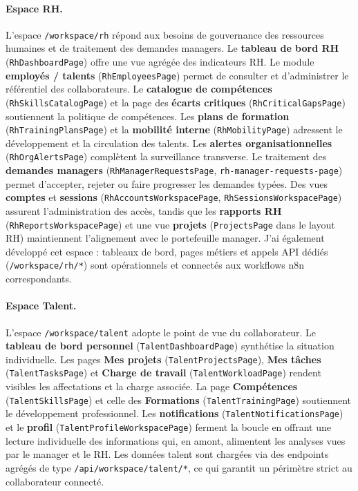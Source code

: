 \paragraph{Espace RH.}
L'espace \texttt{/workspace/rh} répond aux besoins de gouvernance des ressources humaines et de traitement des demandes managers. Le \textbf{tableau de bord RH} (\texttt{RhDashboardPage}) offre une vue agrégée des indicateurs RH. Le module \textbf{employés / talents} (\texttt{RhEmployeesPage}) permet de consulter et d'administrer le référentiel des collaborateurs. Le \textbf{catalogue de compétences} (\texttt{RhSkillsCatalogPage}) et la page des \textbf{écarts critiques} (\texttt{RhCriticalGapsPage}) soutiennent la politique de compétences. Les \textbf{plans de formation} (\texttt{RhTrainingPlansPage}) et la \textbf{mobilité interne} (\texttt{RhMobilityPage}) adressent le développement et la circulation des talents. Les \textbf{alertes organisationnelles} (\texttt{RhOrgAlertsPage}) complètent la surveillance transverse. Le traitement des \textbf{demandes managers} (\texttt{RhManagerRequestsPage}, \texttt{rh-manager-requests-page}) permet d'accepter, rejeter ou faire progresser les demandes typées. Des vues \textbf{comptes} et \textbf{sessions} (\texttt{RhAccountsWorkspacePage}, \texttt{RhSessionsWorkspacePage}) assurent l'administration des accès, tandis que les \textbf{rapports RH} (\texttt{RhReportsWorkspacePage}) et une vue \textbf{projets} (\texttt{ProjectsPage} dans le layout RH) maintiennent l'alignement avec le portefeuille manager. J'ai également développé cet espace : tableaux de bord, pages métiers et appels API dédiés (\texttt{/workspace/rh/*}) sont opérationnels et connectés aux workflows n8n correspondants.

\paragraph{Espace Talent.}
L'espace \texttt{/workspace/talent} adopte le point de vue du collaborateur. Le \textbf{tableau de bord personnel} (\texttt{TalentDashboardPage}) synthétise la situation individuelle. Les pages \textbf{Mes projets} (\texttt{TalentProjectsPage}), \textbf{Mes tâches} (\texttt{TalentTasksPage}) et \textbf{Charge de travail} (\texttt{TalentWorkloadPage}) rendent visibles les affectations et la charge associée. La page \textbf{Compétences} (\texttt{TalentSkillsPage}) et celle des \textbf{Formations} (\texttt{TalentTrainingPage}) soutiennent le développement professionnel. Les \textbf{notifications} (\texttt{TalentNotificationsPage}) et le \textbf{profil} (\texttt{TalentProfileWorkspacePage}) ferment la boucle en offrant une lecture individuelle des informations qui, en amont, alimentent les analyses vues par le manager et le RH. Les données talent sont chargées via des endpoints agrégés de type \texttt{/api/workspace/talent/*}, ce qui garantit un périmètre strict au collaborateur connecté.

